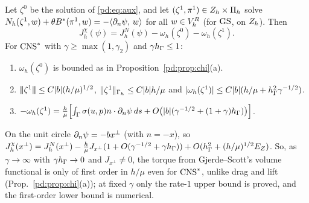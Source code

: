 \begin{proposition}\label{pd:prop:E}
Let $\zeta^0$ be the solution of \eqref{pd:eq:aux}, and let $(\zeta^1,\pi^1)\in Z_h\times\Pi_h$ solve $N_h(\zeta^1,w)+\theta B^\ast(\pi^1,w)=-\langle \partial_n\psi,\, w\rangle$ for all $w\in V_h^R$ (for $\mathrm{GS}$, on $Z_h$). Then
\[
J^\chi_h(\psi)=J^N_h(\psi)-\omega_h(\zeta^0)-\omega_h(\zeta^1).
\]
For $\mathrm{CNS}^\ast$ with $\gamma\ge\max(1,\gamma_2)$ and $\gamma h_\Gamma\le1$:
\begin{enumerate}[label=(\roman*)]
\item $\omega_h(\zeta^0)$ is bounded as in Proposition~\ref{pd:prop:chi}(a).
\item $|\!|\!|\zeta^1|\!|\!|\le C|b|(h/\mu)^{1/2}$, $\lVert \zeta^1\rVert_{\Gamma_h}\le C|b|h/\mu$ and $|\omega_h(\zeta^1)|\le C|b|(h/\mu+h_\Gamma^2\gamma^{-1/2})$.
\item $-\omega_h(\zeta^1)=\frac h\mu\Bigl[\int_\Gamma\sigma(u,p)n\cdot\partial_n\psi\,ds+O\bigl(|b|(\gamma^{-1/2}+(1+\gamma)h_\Gamma)\bigr)\Bigr]$.
\end{enumerate}
On the unit circle $\partial_n\psi=-bx^\perp$ (with $n=-x$), so $J^\chi_h(x^\perp)=J^N_h(x^\perp)-\frac h\mu J_{x^\perp}(1+O(\gamma^{-1/2}+\gamma h_\Gamma))+O(h_\Gamma^2+(h/\mu)^{1/2}E_Z)$. So, as $\gamma\to\infty$ with $\gamma h_\Gamma\to0$ and $J_{x^\perp}\ne0$, the torque from Gjerde--Scott's volume functional is only of first order in $h/\mu$ even for $\mathrm{CNS}^\ast$, unlike drag and lift (Prop.~\ref{pd:prop:chi}(a)); at fixed $\gamma$ only the rate-$1$ upper bound is proved, and the first-order lower bound is numerical.
\end{proposition}

